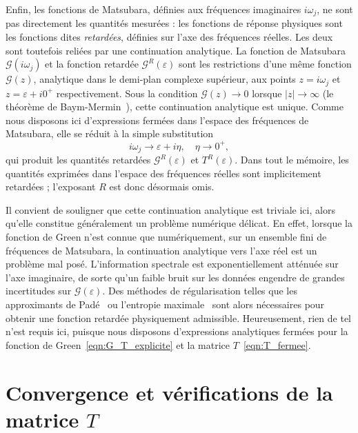 Enfin, les fonctions de Matsubara, définies aux fréquences imaginaires $i\omega_j$, ne sont pas directement les quantités mesurées : les fonctions de réponse physiques sont les fonctions dites \emph{retardées}, définies sur l'axe des fréquences réelles. Les deux sont toutefois reliées par une continuation analytique. La fonction de Matsubara $\mathcal{G}(i\omega_j)$ et la fonction retardée $\mathcal{G}^R(\varepsilon)$ sont les restrictions d'une même fonction $\mathcal{G}(z)$, analytique dans le demi-plan complexe supérieur, aux points $z=i\omega_j$ et $z=\varepsilon+i0^+$ respectivement. Sous la condition $\mathcal{G}(z)\to 0$ lorsque $|z|\to \infty$ (le théorème de Baym-Mermin~\cite{baymDeterminationThermodynamicGreens1961}), cette continuation analytique est unique. Comme nous disposons ici d'expressions fermées dans l'espace des fréquences de Matsubara, elle se réduit à la simple substitution
\begin{equation}
    i\omega_j\to \varepsilon+i\eta, \quad\eta \to 0^+,
\end{equation}
qui produit les quantités retardées $\mathcal{G}^R(\varepsilon)$ et $T^R(\varepsilon)$. Dans tout le mémoire, les quantités exprimées dans l'espace des fréquences réelles sont implicitement retardées ; l'exposant $R$ est donc désormais omis.

Il convient de souligner que cette continuation analytique est triviale ici, alors qu'elle constitue généralement un problème numérique délicat. En effet, lorsque la fonction de Green n'est connue que numériquement, sur un ensemble fini de fréquences de Matsubara, la continuation analytique vers l'axe réel est un problème mal posé. L'information spectrale est exponentiellement atténuée sur l'axe imaginaire, de sorte qu'un faible bruit sur les données engendre de grandes incertitudes sur $\mathcal{G}(\varepsilon)$. Des méthodes de régularisation telles que les approximants de Padé~\cite{vidbergSolvingEliashbergEquations1977} ou l'entropie maximale~\cite{jarrellBayesianInferenceAnalytic1996} sont alors nécessaires pour obtenir une fonction retardée physiquement admissible. Heureusement, rien de tel n'est requis ici, puisque nous disposons d'expressions analytiques fermées pour la fonction de Green~\eqref{eqn:G_T_explicite} et la matrice $T$~\eqref{eqn:T_fermee}.

\clearpage
\section{Convergence et vérifications de la matrice $T$}\label{sec:annexe_T_tests}

